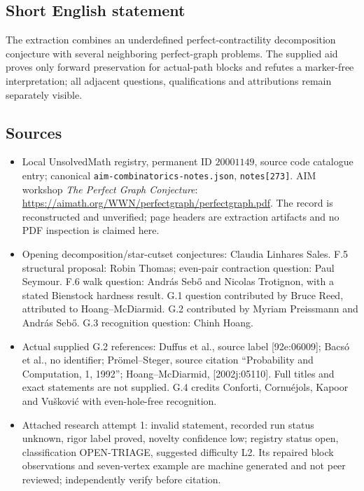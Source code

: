 \documentclass[11pt]{article}
\begin{document}
\subsection{Short English statement}
The extraction combines an underdefined perfect-contractility decomposition conjecture with several neighboring perfect-graph problems. The supplied aid proves only forward preservation for actual-path blocks and refutes a marker-free interpretation; all adjacent questions, qualifications and attributions remain separately visible.
\subsection{Sources}
\begin{itemize}
\item Local UnsolvedMath registry, permanent ID $20001149$, source code catalogue entry; canonical \texttt{aim-combinatorics-notes.json}, \texttt{notes[273]}. AIM workshop \emph{The Perfect Graph Conjecture}: \url{https://aimath.org/WWN/perfectgraph/perfectgraph.pdf}. The record is reconstructed and unverified; page headers are extraction artifacts and no PDF inspection is claimed here.
\item Opening decomposition/star-cutset conjectures: Claudia Linhares Sales. F.5 structural proposal: Robin Thomas; even-pair contraction question: Paul Seymour. F.6 walk question: Andr\'as Seb\H{o} and Nicolas Trotignon, with a stated Bienstock hardness result. G.1 question contributed by Bruce Reed, attributed to Hoang--McDiarmid. G.2 contributed by Myriam Preissmann and Andr\'as Seb\H{o}. G.3 recognition question: Chinh Hoang.
\item Actual supplied G.2 references: Duffus et al., source label [92e:06009]; Bacs\'o et al., no identifier; Pr\"omel--Steger, source citation ``Probability and Computation, 1, 1992''; Hoang--McDiarmid, [2002j:05110]. Full titles and exact statements are not supplied. G.4 credits Conforti, Cornu\'ejols, Kapoor and Vu\v{s}kovi\'c with even-hole-free recognition.
\item Attached research attempt 1: invalid statement, recorded run status unknown, rigor label proved, novelty confidence low; registry status open, classification OPEN-TRIAGE, suggested difficulty L2. Its repaired block observations and seven-vertex example are machine generated and not peer reviewed; independently verify before citation.
\end{itemize}
\end{document}

